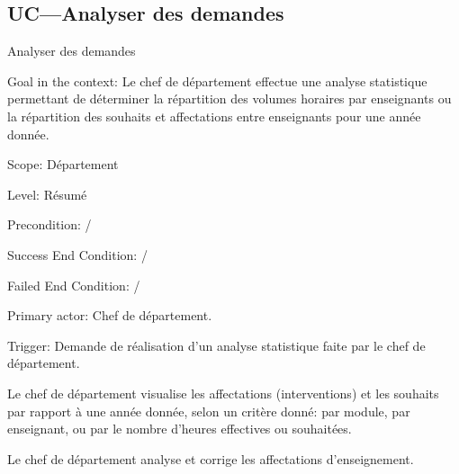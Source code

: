  \subsection{UC---Analyser des demandes}

\begin{usecase}{Analyser des demandes}\label{usecase:analyse}

\begin{information}
	

\item[Goal in the context:] Le chef de département effectue une analyse statistique permettant de déterminer la répartition des volumes horaires par enseignants ou la répartition des souhaits et affectations entre enseignants pour une année donnée. 

\item[Scope:] Département

\item[{Level:}] Résumé

\item[{Precondition:}]
 /

 \item[Success End Condition:]
/

 \item[Failed End Condition:]
 /

 \item[Primary actor:]
 Chef de département.

 \item[Trigger:]
 Demande de réalisation d'un analyse statistique faite par le chef de département.\\
\end{information}

\begin{scenario}
	\item Le chef de département visualise les affectations (interventions) et les souhaits par rapport à une année donnée, selon un critère donné: par module, par enseignant, ou par le nombre d'heures effectives ou souhaitées.
	\item Le chef de département analyse et corrige les affectations d'enseignement.
\end{scenario}

\end{usecase}

